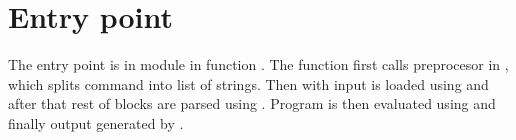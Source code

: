 \section{Entry point}
The entry point is in module  in function . 
The function first calls preprocesor in , which splits command into list of strings. Then  with input is loaded using \break{} and after that
rest of blocks are parsed using \break{}. Program is then evaluated using
\break{} and finally output generated by \break{}.



